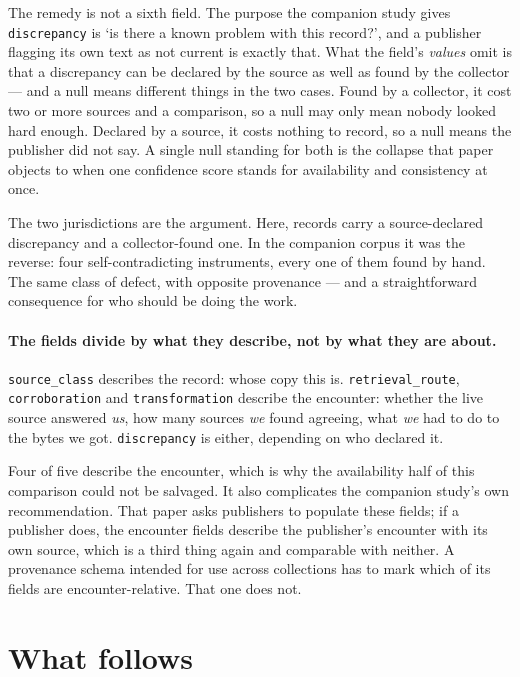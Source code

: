 \documentclass[11pt]{article}
\begin{document}
The remedy is not a sixth field. The purpose the companion study gives
\texttt{discrepancy} is `is there a known problem with this record?', and a
publisher flagging its own text as not current is exactly that. What the
field's \emph{values} omit is that a discrepancy can be declared by the source
as well as found by the collector --- and a null means different things in the
two cases. Found by a collector, it cost two or more sources and a comparison,
so a null may only mean nobody looked hard enough. Declared by a source, it
costs nothing to record, so a null means the publisher did not say. A single
null standing for both is the collapse that paper objects to when one
confidence score stands for availability and consistency at once.

The two jurisdictions are the argument. Here, \nDiscrepancyDeclared{} records
carry a source-declared discrepancy and \nDiscrepancyFound{} a collector-found
one. In the companion corpus it was the reverse: four self-contradicting
instruments, every one of them found by hand. The same class of defect, with
opposite provenance --- and a straightforward consequence for who should be
doing the work.

\paragraph{The fields divide by what they describe, not by what they are
about.} \texttt{source\_class} describes the record: whose copy this is.
\texttt{retrieval\_route}, \texttt{corroboration} and \texttt{transformation}
describe the encounter: whether the live source answered \emph{us}, how many
sources \emph{we} found agreeing, what \emph{we} had to do to the bytes we got.
\texttt{discrepancy} is either, depending on who declared it.

Four of five describe the encounter, which is why the availability half of this
comparison could not be salvaged. It also complicates the companion study's own
recommendation. That paper asks publishers to populate these fields; if a
publisher does, the encounter fields describe the publisher's encounter with
its own source, which is a third thing again and comparable with neither. A
provenance schema intended for use across collections has to mark which of its
fields are encounter-relative. That one does not.

\section{What follows}
\end{document}
